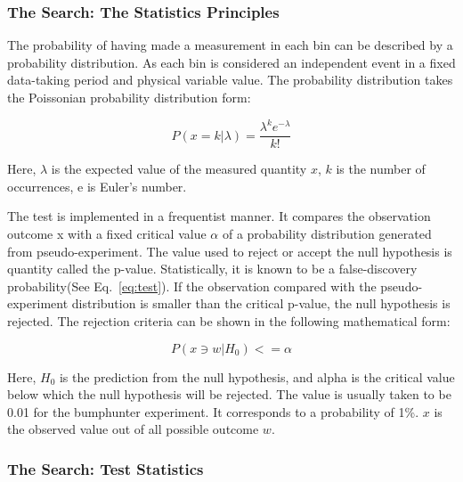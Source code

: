 

\subsubsection{The Search: The Statistics Principles}
The probability of having made a measurement in each bin can be described by a probability distribution. As each bin is considered an independent event in a fixed data-taking period and physical variable value. The probability distribution takes the Poissonian probability distribution form:

\begin{equation}
 P(x=k|\lambda) = \frac{\lambda^{k}e^{-\lambda}}{k!} 
 \label{eq:Poissonian}
\end{equation}

Here, $\lambda$ is the expected value of the measured quantity $x$, $k$ is the number of occurrences, e is Euler's number.

The test is implemented in a frequentist manner. It compares the observation outcome x with a fixed critical value $\alpha$ of a probability distribution generated from pseudo-experiment. The value used to reject or accept the null hypothesis is quantity called the p-value. Statistically, it is known to be a false-discovery probability(See Eq.~\ref{eq:test}). If the observation compared with the pseudo-experiment distribution is smaller than the critical p-value, the null hypothesis is rejected. The rejection criteria can be shown in the following mathematical form:

\begin{equation}
    P(x \ni w|H_0)<= \alpha 
    \label{eq:test}
\end{equation}

Here, $H_0$ is the prediction from the null hypothesis, and alpha is the critical value below which the null hypothesis will be rejected. The value is usually taken to be 0.01 for the bumphunter experiment. It corresponds to a probability of 1\%. $x$ is the observed value out of all possible outcome $w$.  

\subsubsection{The Search: Test Statistics}
\label{teststatistics}

